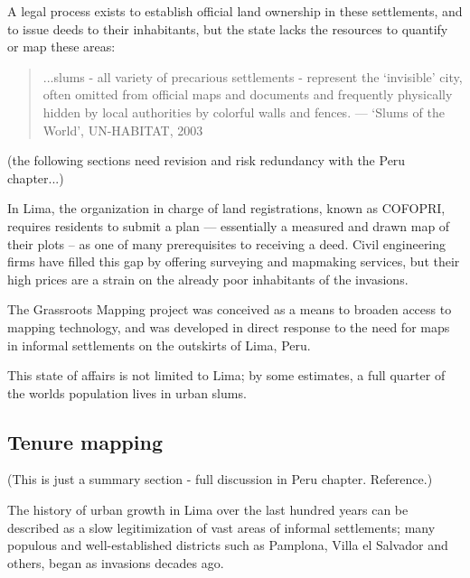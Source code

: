 \documentclass[11pt]{report}
\begin{document}
A legal process exists to establish official land ownership in these settlements, and to issue deeds to their inhabitants, but the state lacks the resources to quantify or map these areas:

\begin{quote}
...slums - all variety of precarious settlements - represent the `invisible' city, often omitted from official maps and documents and frequently physically hidden by local authorities by colorful walls and fences. 
--- `Slums of the World', UN-HABITAT, 2003 \cite{}
\end{quote}

(the following sections need revision and risk redundancy with the Peru chapter...)


In Lima, the organization in charge of land registrations, known as COFOPRI, requires residents to submit a plan --- essentially a measured and drawn map of their plots -- as one of many prerequisites to receiving a deed. Civil engineering firms have filled this gap by offering surveying and mapmaking services, but their high prices are a strain on the already poor inhabitants of the invasions.  


The Grassroots Mapping project was conceived as a means to broaden access to mapping technology, and was developed in direct response to the need for maps in informal settlements on the outskirts of Lima, Peru.

This state of affairs is not limited to Lima; by some estimates, a full quarter of the worlds population lives in urban slums. 


\subsection{Tenure mapping}

(This is just a summary section - full discussion in Peru chapter. Reference.)

The history of urban growth in Lima over the last hundred years can be described as a slow legitimization of vast areas of informal settlements; many populous and well-established districts such as Pamplona, Villa el Salvador and others, began as invasions decades ago.
\end{document}
